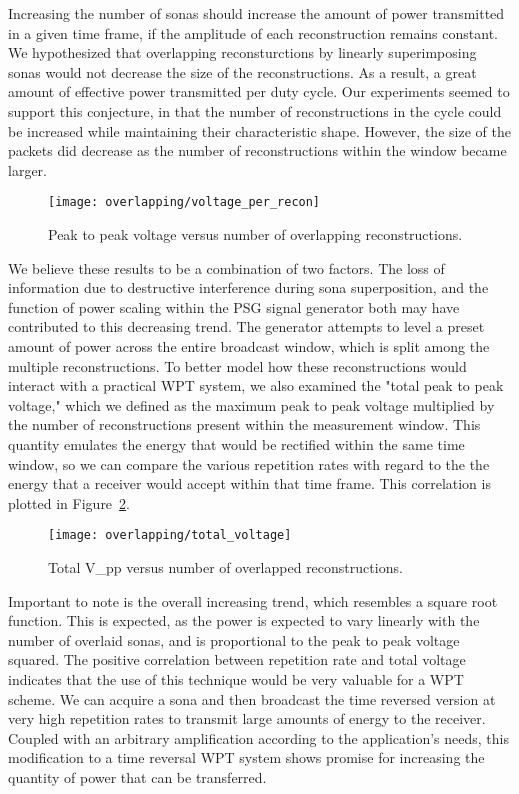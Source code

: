 Increasing the number of sonas should increase the amount of power transmitted in a given time frame, if the amplitude of each reconstruction remains constant. We hypothesized that overlapping reconsturctions by linearly superimposing sonas would not decrease the size of the reconstructions. As a result, a great amount of effective power transmitted per duty cycle. Our experiments seemed to support this conjecture, in that the number of reconstructions in the cycle could be increased while maintaining their characteristic shape. However, the size of the packets did decrease as the number of reconstructions within the window became larger.
\begin{figure}[t]
\centering
\texttt{[image: overlapping/voltage\_per\_recon]}
\caption[Max Vpp from overlapping reconstructions]{Peak to peak voltage versus number of overlapping reconstructions.}
\label{fig:overlapping-vpp}
\end{figure}
We believe these results to be a combination of two factors. The loss of information due to destructive interference during sona superposition, and the function of power scaling within the PSG signal generator both may have contributed to this decreasing trend. The generator attempts to level a preset amount of power across the entire broadcast window, which is split among the multiple reconstructions. 
To better model how these reconstructions would interact with a practical WPT system, we also examined the "total peak to peak voltage," which we defined as the maximum peak to peak voltage multiplied by the number of reconstructions present within the measurement window. This quantity emulates the energy that would be rectified within the same time window, so we can compare the various repetition rates with regard to the the energy that a receiver would accept within that time frame. This correlation is plotted in Figure~\ref{fig:overlapping-total-voltage}.

\begin{figure}[t]
\centering
\texttt{[image: overlapping/total\_voltage]}
\caption[V_{pp} from overlapped reconstructions]{Total V_{pp} versus number of overlapped reconstructions.}
\label{fig:overlapping-total-voltage}
\end{figure}

Important to note is the overall increasing trend, which resembles a square root function. This is expected, as the power is expected to vary linearly with the number of overlaid sonas, and is proportional to the peak to peak voltage squared. The positive correlation between repetition rate and total voltage indicates that the use of this technique would be very valuable for a WPT scheme. We can acquire a sona and then broadcast the time reversed version at very high repetition rates to transmit large amounts of energy to the receiver. Coupled with an arbitrary amplification according to the application's needs, this modification to a time reversal WPT system shows promise for increasing the quantity of power that can be transferred.
